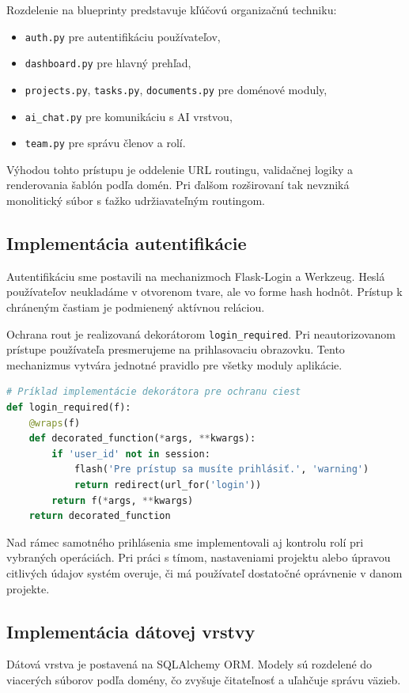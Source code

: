 \documentclass[12pt, a4paper]{article}
\begin{document}
\begin{titlepage}
Rozdelenie na blueprinty predstavuje kľúčovú organizačnú techniku:
\begin{itemize}
    \item \texttt{auth.py} pre autentifikáciu používateľov,
    \item \texttt{dashboard.py} pre hlavný prehľad,
    \item \texttt{projects.py}, \texttt{tasks.py}, \texttt{documents.py} pre doménové moduly,
    \item \texttt{ai\_chat.py} pre komunikáciu s AI vrstvou,
    \item \texttt{team.py} pre správu členov a rolí.
\end{itemize}

Výhodou tohto prístupu je oddelenie URL routingu, validačnej logiky a renderovania šablón podľa domén. Pri ďalšom rozširovaní tak nevzniká monolitický súbor s ťažko udržiavateľným routingom.

\subsection{Implementácia autentifikácie}
Autentifikáciu sme postavili na mechanizmoch Flask-Login a Werkzeug. Heslá používateľov neukladáme v otvorenom tvare, ale vo forme hash hodnôt. Prístup k chráneným častiam je podmienený aktívnou reláciou.

Ochrana rout je realizovaná dekorátorom \texttt{login\_required}. Pri neautorizovanom prístupe používateľa presmerujeme na prihlasovaciu obrazovku. Tento mechanizmus vytvára jednotné pravidlo pre všetky moduly aplikácie.

\begin{lstlisting}[language=Python, frame=single, basicstyle=\footnotesize]
# Príklad implementácie dekorátora pre ochranu ciest
def login_required(f):
    @wraps(f)
    def decorated_function(*args, **kwargs):
        if 'user_id' not in session:
            flash('Pre prístup sa musíte prihlásiť.', 'warning')
            return redirect(url_for('login'))
        return f(*args, **kwargs)
    return decorated_function
\end{lstlisting}

Nad rámec samotného prihlásenia sme implementovali aj kontrolu rolí pri vybraných operáciách. Pri práci s tímom, nastaveniami projektu alebo úpravou citlivých údajov systém overuje, či má používateľ dostatočné oprávnenie v danom projekte.

\subsection{Implementácia dátovej vrstvy}
Dátová vrstva je postavená na SQLAlchemy ORM. Modely sú rozdelené do viacerých súborov podľa domény, čo zvyšuje čitateľnosť a uľahčuje správu väzieb.


\end{titlepage}
\end{document}
